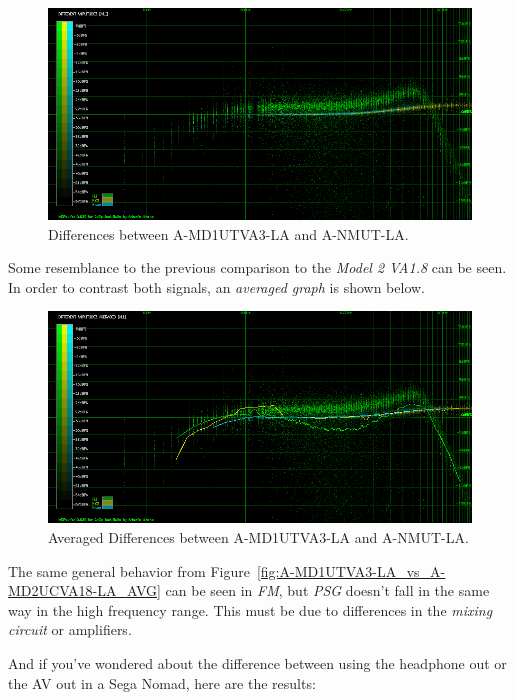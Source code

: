 \documentclass[10pt,a4paper]{report}
\begin{document}
\begin{figure}[H]
	\centering
	\includegraphics[width=1.0\linewidth]{images/results/6-A-MD1UTVA3-LA_vs_A-NMUT-LA.png}
	\caption[A-MD1UTVA3-LA vs A-NMUT-LA]{Differences between A-MD1UTVA3-LA and A-NMUT-LA.}
	\label{fig:A-MD1UTVA3-LA_vs_A-NMUT-LA}
\end{figure}

Some resemblance to the previous comparison to the \textit{Model 2 VA1.8} can be seen. In order to contrast both signals, an \textit{averaged graph} is shown below.

\begin{figure}[H]
	\centering
	\includegraphics[width=1.0\linewidth]{images/results/6-A-MD1UTVA3-LA_vs_A-NMUT-LA-AVG.png}
	\caption[A-MD1UTVA3-LA vs A-NMUT-LA AVG]{Averaged Differences between A-MD1UTVA3-LA and A-NMUT-LA.}
	\label{fig:A-MD1UTVA3-LA_vs_A-NMUT-LA_AVG}
\end{figure}

The same general behavior from Figure~\ref{fig:A-MD1UTVA3-LA_vs_A-MD2UCVA18-LA_AVG} can be seen in \textit{FM}, but \textit{PSG} doesn't fall in the same way in the high frequency range. This must be due to differences in the \textit{mixing circuit} or amplifiers.

And if you've wondered about the difference between using the headphone out or the AV out in a Sega Nomad, here are the results:
\end{document}

